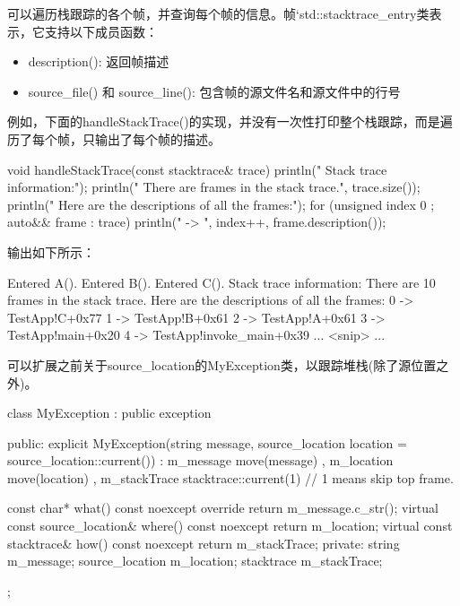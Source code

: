 可以遍历栈跟踪的各个帧，并查询每个帧的信息。帧`std::stacktrace\_entry类表示，它支持以下成员函数：

\begin{itemize}
\item
description(): 返回帧描述

\item
source\_file() 和  source\_line(): 包含帧的源文件名和源文件中的行号
\end{itemize}

例如，下面的handleStackTrace()的实现，并没有一次性打印整个栈跟踪，而是遍历了每个帧，只输出了每个帧的描述。

\begin{cpp}
void handleStackTrace(const stacktrace& trace)
{
    println(" Stack trace information:");
    println(" There are {} frames in the stack trace.", trace.size());
    println(" Here are the descriptions of all the frames:");
    for (unsigned index { 0 }; auto&& frame : trace) {
        println(" {} -> {}", index++, frame.description());
    }
}
\end{cpp}

输出如下所示：

\begin{shell}
Entered A().
Entered B().
Entered C().
  Stack trace information:
    There are 10 frames in the stack trace.
    Here are the descriptions of all the frames:
      0 -> TestApp!C+0x77
      1 -> TestApp!B+0x61
      2 -> TestApp!A+0x61
      3 -> TestApp!main+0x20
      4 -> TestApp!invoke_main+0x39
      ... <snip> ...
\end{shell}


可以扩展之前关于source\_location的MyException类，以跟踪堆栈(除了源位置之外)。

\begin{cpp}
class MyException : public exception
{
    public:
        explicit MyException(string message,
        source_location location = source_location::current())
            : m_message { move(message) }
            , m_location { move(location) }
            , m_stackTrace { stacktrace::current(1) } // 1 means skip top frame.
        { }

        const char* what() const noexcept override { return m_message.c_str(); }
        virtual const source_location& where() const noexcept{ return m_location; }
        virtual const stacktrace& how() const noexcept { return m_stackTrace; }
    private:
        string m_message;
        source_location m_location;
        stacktrace m_stackTrace;
};
\end{cpp}

